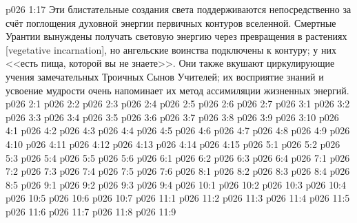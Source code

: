 \vs p026 1:17 Эти блистательные создания света поддерживаются непосредственно за счёт поглощения духовной энергии первичных контуров вселенной. Смертные Урантии вынуждены получать световую энергию через превращения в растениях [vegetative incarnation], но ангельские воинства подключены к контуру; у них <<есть пища, которой вы не знаете>>. Они также вкушают циркулирующие учения замечательных Троичных Сынов Учителей; их восприятие знаний и усвоение мудрости очень напоминает их метод ассимиляции жизненных энергий.
\vs p026 2:1 
\vs p026 2:2 \pc 
\vs p026 2:3 \pc 
\vs p026 2:4 \pc 
\vs p026 2:5 \pc 
\vs p026 2:6 \pc 
\vs p026 2:7 \pc 
{}
\vs p026 3:1 
\vs p026 3:2 
\vs p026 3:3 \pc 
\vs p026 3:4 
\vs p026 3:5 
\vs p026 3:6 
\vs p026 3:7 
\vs p026 3:8 
\vs p026 3:9 
\vs p026 3:10 
\vs p026 4:1 
\vs p026 4:2 \pc 
\vs p026 4:3 
\vs p026 4:4 
\vs p026 4:5 
\vs p026 4:6 
\vs p026 4:7 
\vs p026 4:8 
\vs p026 4:9 
\vs p026 4:10 \pc 
\vs p026 4:11 
\vs p026 4:12 
\vs p026 4:13 
\vs p026 4:14 
\vs p026 4:15 
\vs p026 5:1 
\vs p026 5:2 
\vs p026 5:3 
\vs p026 5:4 
\vs p026 5:5 
\vs p026 5:6 
\vs p026 6:1 
\vs p026 6:2 
\vs p026 6:3 
\vs p026 6:4 
\vs p026 7:1 
\vs p026 7:2 
\vs p026 7:3 
\vs p026 7:4 
\vs p026 7:5 \pc 
\vs p026 7:6 
\vs p026 8:1 
\vs p026 8:2 
\vs p026 8:3 
\vs p026 8:4 \pc 
\vs p026 8:5 
\vs p026 9:1 
\vs p026 9:2 
\vs p026 9:3 \pc 
\vs p026 9:4 
\vs p026 10:1 
\vs p026 10:2 \pc 
\vs p026 10:3 
\vs p026 10:4 
\vs p026 10:5 
\vs p026 10:6 
\vs p026 10:7 
\vs p026 11:1 
\vs p026 11:2 \pc 
\vs p026 11:3 
\vs p026 11:4 
\vs p026 11:5 \pc 
\vs p026 11:6 \pc 
\vs p026 11:7 
\vs p026 11:8 
\vsetoff
\vs p026 11:9 
\quizlink
